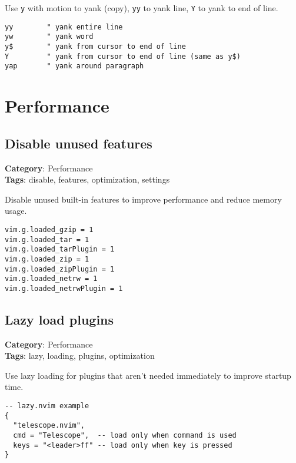 {{{{{{{{{{Use {\footnotesize \Verb§y§} with motion to yank (copy), {\footnotesize \Verb§yy§} to yank line, {\footnotesize \Verb§Y§} to yank to end of line.

\begin{Exa*}{}
\begin{Verbatim}[fontsize=\footnotesize, breaklines, breakanywhere]
yy        " yank entire line
yw        " yank word
y$        " yank from cursor to end of line
Y         " yank from cursor to end of line (same as y$)
yap       " yank around paragraph
\end{Verbatim}
\end{Exa*}

\chapter{Performance}
\section{Disable unused features}

\textbf{Category}: Performance\\ \textbf{Tags}: disable, features, optimization, settings
\vspace{0.5cm}

Disable unused built-in features to improve performance and reduce memory usage.

\begin{Exa*}{}
\begin{Verbatim}[fontsize=\footnotesize, breaklines, breakanywhere]
vim.g.loaded_gzip = 1
vim.g.loaded_tar = 1
vim.g.loaded_tarPlugin = 1
vim.g.loaded_zip = 1
vim.g.loaded_zipPlugin = 1
vim.g.loaded_netrw = 1
vim.g.loaded_netrwPlugin = 1
\end{Verbatim}
\end{Exa*}

\section{Lazy load plugins}

\textbf{Category}: Performance\\ \textbf{Tags}: lazy, loading, plugins, optimization
\vspace{0.5cm}

Use lazy loading for plugins that aren't needed immediately to improve startup time.

\begin{Exa*}{}
\begin{Verbatim}[fontsize=\footnotesize, breaklines, breakanywhere]
-- lazy.nvim example
{
  "telescope.nvim",
  cmd = "Telescope",  -- load only when command is used
  keys = "<leader>ff" -- load only when key is pressed
}
\end{Verbatim}
\end{Exa*}

}}}}}}}}}}
